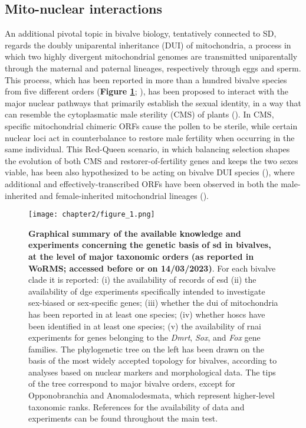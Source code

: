 \documentclass[../main.tex]{subfiles}
\begin{document}
\subsection{Mito-nuclear interactions}
An additional pivotal topic in bivalve biology, tentatively connected to SD, regards the doubly uniparental inheritance (DUI) of mitochondria, a process in which two highly divergent mitochondrial genomes are transmitted uniparentally through the maternal and paternal lineages, respectively through eggs and sperm. This process, which has been reported in more than a hundred bivalve species from five different orders (\textbf{Figure \ref{fig:summarySex}}; \textbf{\cite{gusman2016pursuing,capt2020unorthodox}}), has been proposed to interact with the major nuclear pathways that primarily establish the sexual identity, in a way that can resemble the cytoplasmatic male sterility (CMS) of plants (\textbf{\cite{ghiselli2013structure,breton2022did}}). In CMS, specific mitochondrial chimeric ORFs cause the pollen to be sterile, while certain nuclear loci act in counterbalance to restore male fertility when occurring in the same individual. This Red-Queen scenario, in which balancing selection shapes the evolution of both CMS and restorer-of-fertility genes and keeps the two sexes viable, has been also hypothesized to be acting on bivalve DUI species (\textbf{\cite{ghiselli2013structure,xu2022lack}}), where additional and effectively-transcribed ORFs have been observed in both the male-inherited and female-inherited mitochondrial lineages (\textbf{\cite{milani2013nuclear,milani2014paternally}}).

\begin{figure}
    \centering
    \texttt{[image: chapter2/figure\_1.png]}
    \captionsetup{width=\textwidth}
    \caption{
    \textbf{Graphical summary of the available knowledge and experiments concerning the genetic basis of \gls{sd} in bivalves, at the level of major taxonomic orders (as reported in WoRMS; accessed before or on 14/03/2023)}. For each bivalve clade it is reported: (i) the availability of records of \gls{esd} (ii) the availability of \gls{dge} experiments specifically intended to investigate sex-biased or sex-specific genes; (iii) whether the \gls{dui} of mitochondria has been reported in at least one species; (iv) whether \glspl{hosc} have been identified in at least one species; (v) the availability of \gls{rnai} experiments for genes belonging to the \textit{Dmrt}, \textit{Sox}, and \textit{Fox} gene families. The phylogenetic tree on the left has been drawn on the basis of the most widely accepted topology for bivalves, according to analyses based on nuclear markers and morphological data. The tips of the tree correspond to major bivalve orders, except for Opponobranchia and Anomalodesmata, which represent higher-level taxonomic ranks. References for the availability of data and experiments can be found throughout the main test.
    }
    \label{fig:summarySex}
\end{figure}
\end{document}
